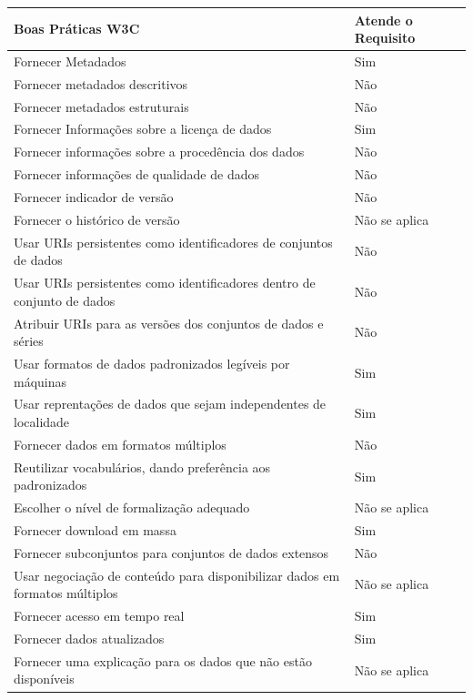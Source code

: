 \begin{center}
\begin{tabularx}{1\textwidth} { 
  | >{\centering\arraybackslash}X 
  | >{\centering\arraybackslash}X | }
 \hline
 Boas Práticas W3C & Atende o Requisito \\
 \hline
 Fornecer Metadados & Sim \\
 \hline
 Fornecer metadados descritivos & Não \\
\hline
Fornecer metadados estruturais & Não \\
\hline
Fornecer Informações sobre a licença de dados & Sim \\
\hline
Fornecer informações sobre a procedência dos dados & Não \\
\hline
Fornecer informações de qualidade de dados & Não \\
\hline
Fornecer indicador de versão & Não \\
\hline
Fornecer o histórico de versão & Não se aplica \\
\hline
Usar URIs persistentes como identificadores de conjuntos de dados & Não \\
\hline
Usar URIs persistentes como identificadores dentro de conjunto de dados & Não \\
\hline
Atribuir URIs para as versões dos conjuntos de dados e séries & Não \\
\hline
Usar formatos de dados padronizados legíveis por máquinas & Sim \\
\hline
Usar reprentações de dados que sejam independentes de localidade & Sim \\
\hline
Fornecer dados em formatos múltiplos & Não \\
\hline
Reutilizar vocabulários, dando preferência aos padronizados & Sim \\
\hline
Escolher o nível de formalização adequado & Não se aplica \\
\hline
Fornecer download em massa & Sim \\
\hline
Fornecer subconjuntos para conjuntos de dados extensos & Não \\
\hline
Usar negociação de conteúdo para disponibilizar dados em formatos múltiplos & Não se aplica \\
\hline
Fornecer acesso em tempo real & Sim \\
\hline
Fornecer dados atualizados & Sim \\
\hline
Fornecer uma explicação para os dados que não estão disponíveis & Não se aplica \\
\hline
\end{tabularx}
\end{center}

